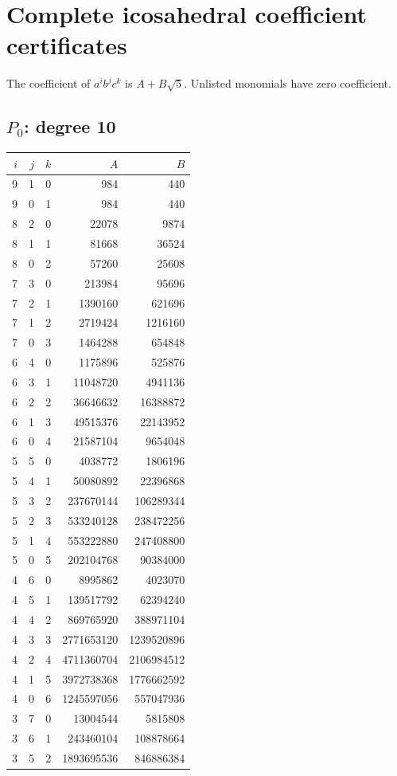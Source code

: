 \section{Complete icosahedral coefficient certificates}
The coefficient of $a^ib^jc^k$ is $A+B\sqrt5$. Unlisted monomials have zero coefficient.
\subsection{\texorpdfstring{$P_0$}{P0}: degree 10}
\begin{longtable}{rrr|rr}
$i$&$j$&$k$&$A$&$B$\\\hline\endhead
9&1&0&984&440\\
9&0&1&984&440\\
8&2&0&22078&9874\\
8&1&1&81668&36524\\
8&0&2&57260&25608\\
7&3&0&213984&95696\\
7&2&1&1390160&621696\\
7&1&2&2719424&1216160\\
7&0&3&1464288&654848\\
6&4&0&1175896&525876\\
6&3&1&11048720&4941136\\
6&2&2&36646632&16388872\\
6&1&3&49515376&22143952\\
6&0&4&21587104&9654048\\
5&5&0&4038772&1806196\\
5&4&1&50080892&22396868\\
5&3&2&237670144&106289344\\
5&2&3&533240128&238472256\\
5&1&4&553222880&247408800\\
5&0&5&202104768&90384000\\
4&6&0&8995862&4023070\\
4&5&1&139517792&62394240\\
4&4&2&869765920&388971104\\
4&3&3&2771653120&1239520896\\
4&2&4&4711360704&2106984512\\
4&1&5&3972738368&1776662592\\
4&0&6&1245597056&557047936\\
3&7&0&13004544&5815808\\
3&6&1&243460104&108878664\\
3&5&2&1893695536&846886384\\

\end{longtable}
